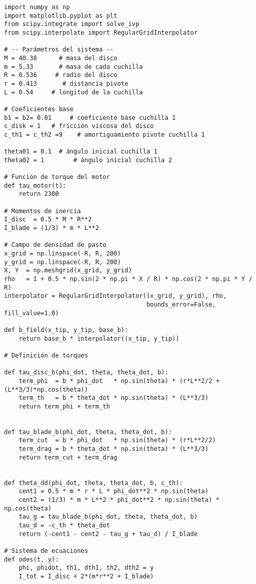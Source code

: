\documentclass[12pt]{article}
\begin{document}
\begin{verbatim}
import numpy as np
import matplotlib.pyplot as plt
from scipy.integrate import solve_ivp
from scipy.interpolate import RegularGridInterpolator

# -- Parámetros del sistema --
M = 40.38      # masa del disco
m = 5.33       # masa de cada cuchilla
R = 0.536     # radio del disco
r = 0.413       # distancia pivote
L = 0.54     # longitud de la cuchilla

# Coeficientes base
b1 = b2= 0.01     # coeficiente base cuchilla 1
c_disk = 1   # fricción viscosa del disco
c_th1 = c_th2 =9    # amortiguamiento pivote cuchilla 1

theta01 = 0.1  # ángulo inicial cuchilla 1
theta02 = 1        # ángulo inicial cuchilla 2

# Función de torque del motor
def tau_motor(t):
    return 2300

# Momentos de inercia
I_disc  = 0.5 * M * R**2
I_blade = (1/3) * m * L**2

# Campo de densidad de pasto
x_grid = np.linspace(-R, R, 200)
y_grid = np.linspace(-R, R, 200)
X, Y  = np.meshgrid(x_grid, y_grid)
rho   = 1 + 0.5 * np.sin(2 * np.pi * X / R) * np.cos(2 * np.pi * Y / R)
interpolator = RegularGridInterpolator((x_grid, y_grid), rho,
                                       bounds_error=False, fill_value=1.0)

def b_field(x_tip, y_tip, base_b):
    return base_b * interpolator((x_tip, y_tip))

# Definición de torques

def tau_disc_b(phi_dot, theta, theta_dot, b):
    term_phi  = b * phi_dot   * np.sin(theta) * (r*L**2/2 + (L**3/3)*np.cos(theta))
    term_th   = b * theta_dot * np.sin(theta) * (L**3/3)
    return term_phi + term_th


def tau_blade_b(phi_dot, theta, theta_dot, b):
    term_cut  = b * phi_dot   * np.sin(theta) * (r*L**2/2)
    term_drag = b * theta_dot * np.sin(theta) * (L**3/3)
    return term_cut + term_drag


def theta_dd(phi_dot, theta, theta_dot, b, c_th):
    cent1 = 0.5 * m * r * L * phi_dot**2 * np.sin(theta)
    cent2 = (1/3) * m * L**2 * phi_dot**2 * np.sin(theta) * np.cos(theta)
    tau_g = tau_blade_b(phi_dot, theta, theta_dot, b)
    tau_d = -c_th * theta_dot
    return (-cent1 - cent2 - tau_g + tau_d) / I_blade

# Sistema de ecuaciones
def odes(t, y):
    phi, phidot, th1, dth1, th2, dth2 = y
    I_tot = I_disc + 2*(m*r**2 + I_blade)


\end{verbatim}
\end{document}
